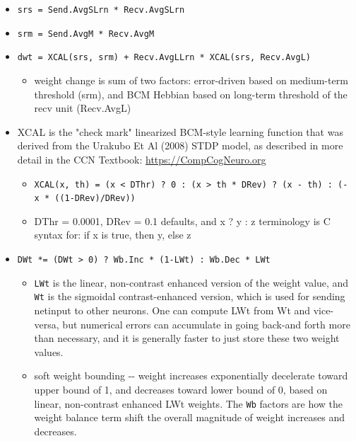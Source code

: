 \documentclass[11pt,twoside]{article}
\newif\myifpdf
\providecommand{\tightlist}{%
  \setlength{\itemsep}{.25in}\setlength{\parskip}{-.25in}}
\begin{document}
\begin{itemize}
  \item \texttt{srs\ =\ Send.AvgSLrn\ *\ Recv.AvgSLrn}

  \item \texttt{srm\ =\ Send.AvgM\ *\ Recv.AvgM}

  \item \texttt{dwt\ =\ XCAL(srs,\ srm)\ +\ Recv.AvgLLrn\ *\ XCAL(srs,\ Recv.AvgL)}

    \begin{itemize}
	\tightlist
    \item
      weight change is sum of two factors: error-driven based on
      medium-term threshold (srm), and BCM Hebbian based on long-term
      threshold of the recv unit (Recv.AvgL)
    \end{itemize}
	
  \item
    XCAL is the "check mark" linearized BCM-style learning function that was derived from the Urakubo Et Al (2008) STDP model, as described in more detail in the CCN Textbook: \url{https://CompCogNeuro.org}

    \begin{itemize}
	\tightlist
    \item
      \texttt{XCAL(x,\ th)\ =\ (x\ \textless{}\ DThr)\ ?\ 0\ :\ (x\ \textgreater{}\ th\ *\ DRev)\ ?\ (x\ -\ th)\ :\ (-x\ *\ ((1-DRev)/DRev))}
    \item
      DThr = 0.0001, DRev = 0.1 defaults, and x ? y : z terminology is C
      syntax for: if x is true, then y, else z
    \end{itemize}
	
  \item \texttt{DWt\ *=\ (DWt\ \textgreater{}\ 0)\ ?\ Wb.Inc\ *\ (1-LWt)\ :\ Wb.Dec\ *\ LWt}
	
    \begin{itemize}
	\tightlist
    \item \texttt{LWt} is the linear, non-contrast enhanced version
    of the weight value, and \texttt{Wt} is the sigmoidal
    contrast-enhanced version, which is used for sending netinput to
    other neurons. One can compute LWt from Wt and vice-versa, but
    numerical errors can accumulate in going back-and forth more than
    necessary, and it is generally faster to just store these two weight
    values.
    \item
      soft weight bounding -\/- weight increases exponentially
      decelerate toward upper bound of 1, and decreases toward lower
      bound of 0, based on linear, non-contrast enhanced LWt weights.
      The \texttt{Wb} factors are how the weight balance term shift the
      overall magnitude of weight increases and decreases.
    \end{itemize}
	

\end{itemize}
\end{document}
